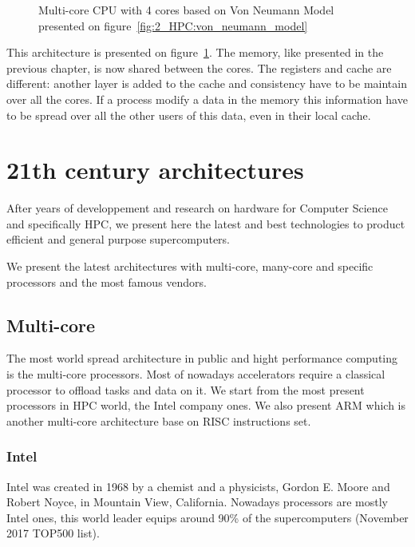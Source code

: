 \begin{figure}
\centering 

\caption{Multi-core CPU with 4 cores based on Von Neumann Model presented on figure~\ref{fig:2_HPC:von_neumann_model}}
\label{fig:2_HARD:von_neumann_model_multi-core}
\end{figure}

This architecture is presented on figure~\ref{fig:2_HARD:von_neumann_model_multi-core}.
The memory, like presented in the previous chapter, is now shared between the cores. 
The registers and cache are different: another layer is added to the cache and consistency have to be maintain over all the cores. 
If a process modify a data in the memory this information have to be spread over all the other users of this data, even in their local cache. 


\section{21th century architectures}
After years of developpement and research on hardware for Computer Science and specifically HPC, we present here the latest and best technologies to product efficient and general purpose supercomputers.

We present the latest architectures with multi-core, many-core and specific processors and the most famous vendors. 

\subsection{Multi-core}
The most world spread architecture in public and hight performance computing is the multi-core processors. 
Most of nowadays accelerators require a classical processor to offload tasks and data on it. 
We start from the most present processors in HPC world, the Intel company ones. 
We also present ARM which is another multi-core architecture base on RISC instructions set.

\subsubsection{Intel}
Intel was created in 1968 by a chemist and a physicists, Gordon E. Moore and Robert Noyce, in Mountain View, California. 
Nowadays processors are mostly Intel ones, this world leader equips around 90\% of the supercomputers (November 2017 TOP500 list).

